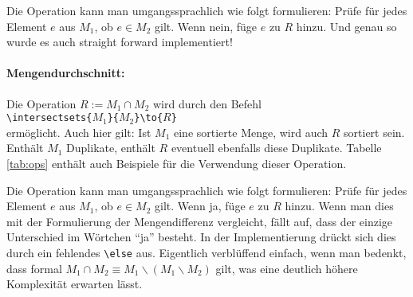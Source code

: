 Die Operation kann man umgangssprachlich wie folgt formulieren: Prüfe für jedes Element $e$ aus $M_1$, ob $e \in M_2$ gilt. Wenn nein, füge $e$ zu $R$ hinzu. Und genau so wurde es auch straight forward implementiert!

\paragraph{Mengendurchschnitt:} Die Operation $R := M_1 \cap M_2$ wird durch den Befehl\\
\mbox{}\hspace{2em}\verb|\intersectsets{|$M_1$\verb|}{|$M_2$\verb|}\to{|$R$\verb|}|\\
ermöglicht. Auch hier gilt: Ist $M_1$ eine sortierte Menge, wird auch $R$ sortiert sein. Enthält $M_1$ Duplikate, enthält $R$ eventuell ebenfalls diese Duplikate.
Tabelle \ref{tab:ops} enthält auch Beispiele für die Verwendung dieser Operation.

Die Operation kann man umgangssprachlich wie folgt formulieren: Prüfe für jedes Element $e$ aus $M_1$, ob $e \in M_2$ gilt. Wenn ja, füge $e$ zu $R$ hinzu. Wenn man dies mit der Formulierung der Mengendifferenz vergleicht, fällt auf, dass der einzige Unterschied im Wörtchen "`ja"' besteht. In der Implementierung drückt sich dies durch ein fehlendes \verb|\else| aus. Eigentlich verblüffend einfach, wenn man bedenkt, dass formal $M_1 \cap M_2 \equiv M_1 \backslash (M_1\backslash M_2)$ gilt, was eine deutlich höhere Komplexität erwarten lässt.

